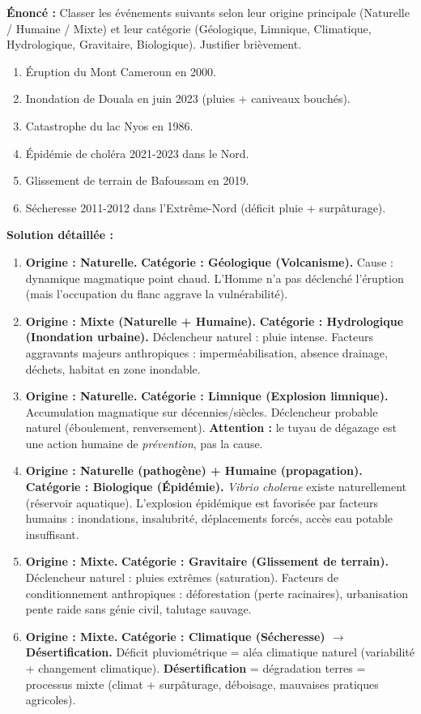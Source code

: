 \documentclass[11pt]{article}
\begin{document}
\begin{exoresolu}
\textbf{Énoncé :} Classer les événements suivants selon leur origine principale (Naturelle / Humaine / Mixte) et leur catégorie (Géologique, Limnique, Climatique, Hydrologique, Gravitaire, Biologique). Justifier brièvement.
\begin{enumerate}
    \item Éruption du Mont Cameroun en 2000.
    \item Inondation de Douala en juin 2023 (pluies + caniveaux bouchés).
    \item Catastrophe du lac Nyos en 1986.
    \item Épidémie de choléra 2021-2023 dans le Nord.
    \item Glissement de terrain de Bafoussam en 2019.
    \item Sécheresse 2011-2012 dans l'Extrême-Nord (déficit pluie + surpâturage).
\end{enumerate}

\textbf{Solution détaillée :}
\begin{enumerate}
    \item \textbf{Origine : Naturelle.} \textbf{Catégorie : Géologique (Volcanisme).} Cause : dynamique magmatique point chaud. L'Homme n'a pas déclenché l'éruption (mais l'occupation du flanc aggrave la vulnérabilité).
    \item \textbf{Origine : Mixte (Naturelle + Humaine).} \textbf{Catégorie : Hydrologique (Inondation urbaine).} Déclencheur naturel : pluie intense. Facteurs aggravants majeurs anthropiques : imperméabilisation, absence drainage, déchets, habitat en zone inondable.
    \item \textbf{Origine : Naturelle.} \textbf{Catégorie : Limnique (Explosion limnique).} Accumulation  magmatique sur décennies/siècles. Déclencheur probable naturel (éboulement, renversement). \textbf{Attention :} le tuyau de dégazage est une action humaine de \emph{prévention}, pas la cause.
    \item \textbf{Origine : Naturelle (pathogène) + Humaine (propagation).} \textbf{Catégorie : Biologique (Épidémie).} \emph{Vibrio cholerae} existe naturellement (réservoir aquatique). L'explosion épidémique est favorisée par facteurs humains : inondations, insalubrité, déplacements forcés, accès eau potable insuffisant.
    \item \textbf{Origine : Mixte.} \textbf{Catégorie : Gravitaire (Glissement de terrain).} Déclencheur naturel : pluies extrêmes (saturation). Facteurs de conditionnement anthropiques : déforestation (perte racinaires), urbanisation pente raide sans génie civil, talutage sauvage.
    \item \textbf{Origine : Mixte.} \textbf{Catégorie : Climatique (Sécheresse) $\rightarrow$ Désertification.} Déficit pluviométrique = aléa climatique naturel (variabilité + changement climatique). \textbf{Désertification} = dégradation terres = processus mixte (climat + surpâturage, déboisage, mauvaises pratiques agricoles).
\end{enumerate}
\end{exoresolu}
\end{document}
